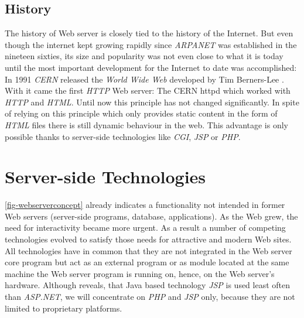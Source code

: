 \documentclass[
  a4paper,               %
  twoside,               %
  headings=small,        %
  DIV=12,                %
  BCOR=1cm,              %
  headinclude=true,      %
  footinclude=true,      %
  numbers=noenddot,      %
  11pt]{scrartcl}        %
\begin{document}
\subsection{History}

The history of Web server is closely tied to the history of the Internet. But even though the internet kept growing rapidly since \emph{ARPANET} was established in the nineteen sixties, its size and popularity was not even close to what it is today until the most important development for the Internet to date was accomplished: In 1991 \emph{CERN} released the \emph{World Wide Web} developed by Tim Berners-Lee \cite{webhistory}. With it came the first \textit{HTTP} Web server: The CERN httpd which worked with \textit{HTTP} and \textit{HTML}\cite{cernHttpd}. Until now this principle has not changed significantly. In spite of relying on this principle which only provides static content in the form of \textit{HTML} files there is still dynamic behaviour in the web. This advantage is only possible thanks to server-side technologies like \textit{CGI}, \textit{JSP} or \textit{PHP}. 

\section{Server-side Technologies}

\autoref{fig-webserverconcept} already indicates a functionality not intended in former Web servers (server-side programs, database, applications). As the Web grew, the need for interactivity became more urgent. As a result a number of competing technologies evolved to satisfy those needs for attractive and modern Web sites. All technologies have in common that they are not integrated in the Web server core program but act as an external program or as module located at the same machine the Web server program is running on, hence, on the Web server's hardware. Although \cite{w3TechsStats} reveals, that Java based technology \textit{JSP} is used least often than \textit{ASP.NET}, we will concentrate on \textit{PHP} and \textit{JSP} only, because they are not limited to proprietary platforms. 
\end{document}
